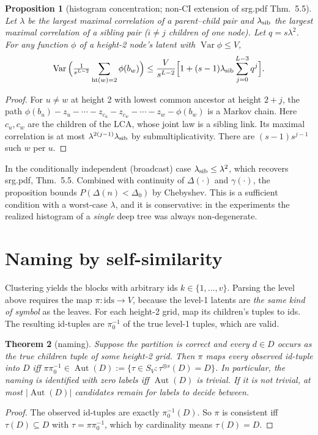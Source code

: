 \documentclass[11pt]{article}
\newtheorem{theorem}{Theorem}
\newtheorem{proposition}[theorem]{Proposition}
\theoremstyle{definition}
\newcommand{\Var}{\operatorname{Var}}
\newcommand{\Aut}{\operatorname{Aut}}
\newcommand{\hgt}{\operatorname{ht}}
\begin{document}
\begin{proposition}[histogram concentration; non-CI extension of srg.pdf Thm.~5.5]\label{prop:neff}
Let $\lambda$ be the largest maximal correlation of a parent--child pair and $\lambda_{\rm sib}$
the largest maximal correlation of a sibling pair ($i\ne j$ children of one node). Let
$q=s\lambda^2$. For any function $\phi$ of a height-2 node's latent with $\Var\phi\le V$,
\[
\Var\Big(\tfrac1{s^{L-2}}\sum_{\hgt(w)=2}\phi(b_w)\Big)\le\frac{V}{s^{L-2}}\Big[1+(s-1)\lambda_{\rm sib}\sum_{j=0}^{L-3}q^j\Big].
\]
\end{proposition}
\begin{proof}
For $u\ne w$ at height 2 with lowest common ancestor at height $2+j$, the path
$\phi(b_u)-z_u-\cdots-z_{c_u}-z_{c_w}-\cdots-z_w-\phi(b_w)$ is a Markov chain. Here $c_u,c_w$ are
the children of the LCA, whose joint law is a sibling link. Its maximal correlation is at most
$\lambda^{2(j-1)}\lambda_{\rm sib}$ by submultiplicativity. There are $(s-1)s^{j-1}$ such $w$ per $u$.
\end{proof}
\noindent In the conditionally independent (broadcast) case $\lambda_{\rm sib}\le\lambda^2$, which
recovers srg.pdf, Thm.~5.5. Combined with continuity of $\Delta(\cdot)$ and $\gamma(\cdot)$, the
proposition bounds $P(\Delta(n)<\Delta_0)$ by Chebyshev. This is a sufficient condition with a
worst-case $\lambda$, and it is conservative: in the experiments the realized histogram of a
\emph{single} deep tree was always non-degenerate.

\section{Naming by self-similarity}
Clustering yields the blocks with arbitrary ids $k\in\{1,\dots,v\}$. Parsing the level above
requires the map $\pi:\text{ids}\to V$, because the level-1 latents are \emph{the same kind of
symbol} as the leaves. For each height-2 grid, map its children's tuples to ids. The resulting
id-tuples are $\pi_0^{-1}$ of the true level-1 tuples, which are valid.

\begin{theorem}[naming]\label{thm:name}
Suppose the partition is correct and every $d\in D$ occurs as the true children tuple of some
height-2 grid. Then $\pi$ maps every observed id-tuple into $D$ iff
$\pi\pi_0^{-1}\in\Aut(D):=\{\tau\in S_V:\tau^{\otimes s}(D)=D\}$. In particular, the naming is
identified with \emph{zero labels} iff $\Aut(D)$ is trivial. If it is not trivial, at most
$|\Aut(D)|$ candidates remain for labels to decide between.
\end{theorem}
\begin{proof}The observed id-tuples are exactly $\pi_0^{-1}(D)$. So $\pi$ is consistent iff
$\tau(D)\subseteq D$ with $\tau=\pi\pi_0^{-1}$, which by cardinality means $\tau(D)=D$.\end{proof}
\end{document}
